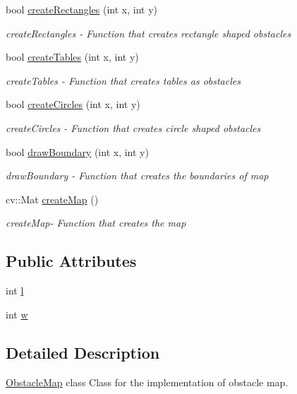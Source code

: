 \begin{DoxyCompactItemize}
bool \hyperlink{class_obstacle_map_ac61682abf414740f2776231363c845aa}{create\+Rectangles} (int x, int y)
\begin{DoxyCompactList}\small\item\em create\+Rectangles -\/ Function that creates rectangle shaped obstacles \end{DoxyCompactList}\item 
bool \hyperlink{class_obstacle_map_ab5a913058a0bf671abdbd90c9159dfd3}{create\+Tables} (int x, int y)
\begin{DoxyCompactList}\small\item\em create\+Tables -\/ Function that creates tables as obstacles \end{DoxyCompactList}\item 
bool \hyperlink{class_obstacle_map_a47f8d38845ea5a59f62299c007dad347}{create\+Circles} (int x, int y)
\begin{DoxyCompactList}\small\item\em create\+Circles -\/ Function that creates circle shaped obstacles \end{DoxyCompactList}\item 
bool \hyperlink{class_obstacle_map_a4d4a68b49bcbd7d4bb75ecea85353edc}{draw\+Boundary} (int x, int y)
\begin{DoxyCompactList}\small\item\em draw\+Boundary -\/ Function that creates the boundaries of map \end{DoxyCompactList}\item 
cv\+::\+Mat \hyperlink{class_obstacle_map_a8a50b289f56973c1ef8de9cd3fb2a87e}{create\+Map} ()
\begin{DoxyCompactList}\small\item\em create\+Map-\/ Function that creates the map \end{DoxyCompactList}\end{DoxyCompactItemize}
\subsection*{Public Attributes}
\begin{DoxyCompactItemize}
\item 
int \hyperlink{class_obstacle_map_a575aaad3531c0e18334744280c67eefd}{l}
\item 
int \hyperlink{class_obstacle_map_a094dba5815e681e22cc363a4cd8b511a}{w}
\end{DoxyCompactItemize}


\subsection{Detailed Description}
\hyperlink{class_obstacle_map}{Obstacle\+Map} class Class for the implementation of obstacle map. 

